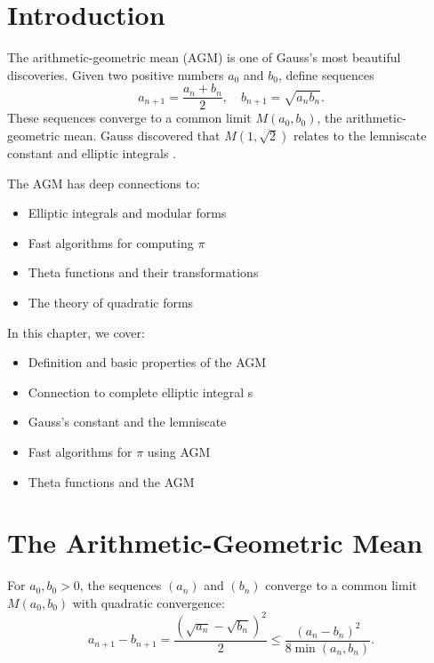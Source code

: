 \section{Introduction}

The arithmetic-geometric mean  (AGM) is one of Gauss's most beautiful discoveries. Given two positive numbers $a_0$ and $b_0$, define sequences
\[
a_{n+1} = \frac{a_n + b_n}{2}, \quad b_{n+1} = \sqrt{a_n b_n}.
\]
These sequences converge to a common limit $M(a_0, b_0)$, the arithmetic-geometric mean. Gauss discovered that $M(1, \sqrt{2})$ relates to the lemniscate  constant and elliptic integrals .

The AGM has deep connections to:
\begin{itemize}
    \item Elliptic integrals and modular forms 
    \item Fast algorithms for computing $\pi$ 
    \item Theta functions  and their transformations
    \item The theory of quadratic forms 
\end{itemize}

In this chapter, we cover:
\begin{itemize}
    \item Definition and basic properties of the AGM
    \item Connection to complete elliptic integral s
    \item Gauss's constant  and the lemniscate
    \item Fast algorithms for $\pi$ using AGM
    \item Theta functions and the AGM
\end{itemize}

\section{The Arithmetic-Geometric Mean}

\begin{theorem}
For $a_0, b_0 > 0$, the sequences $(a_n)$ and $(b_n)$ converge to a common limit $M(a_0, b_0)$ with quadratic convergence:
\[
a_{n+1} - b_{n+1} = \frac{(\sqrt{a_n} - \sqrt{b_n})^2}{2} \le \frac{(a_n - b_n)^2}{8\min(a_n,b_n)}.
\]
\end{theorem}

